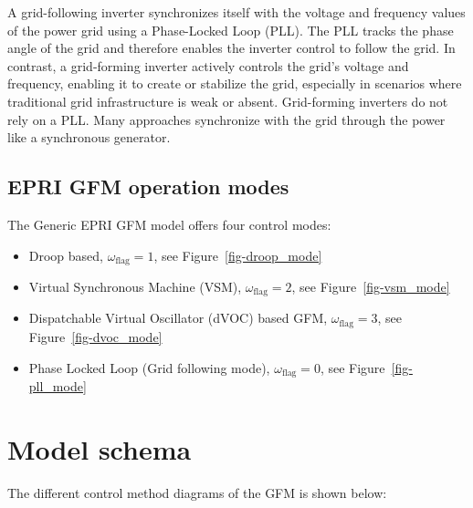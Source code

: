 \documentclass[
  a4paper,
  DIV=11,
  numbers=noendperiod]{scrartcl}
\providecommand{\tightlist}{%
  \setlength{\itemsep}{0pt}\setlength{\parskip}{0pt}}\usepackage{longtable,booktabs,array}
\begin{document}
A grid-following inverter synchronizes itself with the voltage and
frequency values of the power grid using a Phase-Locked Loop (PLL). The
PLL tracks the phase angle of the grid and therefore enables the
inverter control to follow the grid. In contrast, a grid-forming
inverter actively controls the grid's voltage and frequency, enabling it
to create or stabilize the grid, especially in scenarios where
traditional grid infrastructure is weak or absent. Grid-forming
inverters do not rely on a PLL. Many approaches synchronize with the
grid through the power like a synchronous generator.

\subsection{EPRI GFM operation modes}\label{epri-gfm-operation-modes}

The Generic EPRI GFM model offers four control modes:

\begin{itemize}
\tightlist
\item
  Droop based, \(\omega_\mathrm{flag}=1\), see
  Figure~\ref{fig-droop_mode}
\item
  Virtual Synchronous Machine (VSM), \(\omega_\mathrm{flag}=2\), see
  Figure~\ref{fig-vsm_mode}
\item
  Dispatchable Virtual Oscillator (dVOC) based GFM,
  \(\omega_\mathrm{flag}=3\), see Figure~\ref{fig-dvoc_mode}
\item
  Phase Locked Loop (Grid following mode), \(\omega_\mathrm{flag}=0\),
  see Figure~\ref{fig-pll_mode}
\end{itemize}

\section{Model schema}\label{model-schema}

The different control method diagrams of the GFM is shown below:
\end{document}
